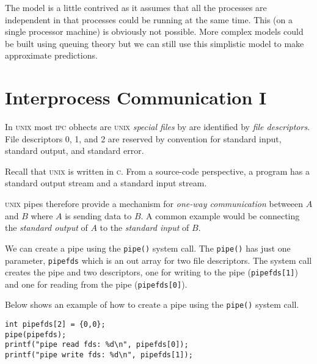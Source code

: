 The model is a little contrived as it assumes that all the processes are independent in that processes 
could be running at the same time. This (on a single processor machine) is obviously not possible. 
More complex models could be built using queuing theory but we can still use this simplistic model 
to make approximate predictions. 

\frmrule

\begin{example}

\end{example}

\frmrule


\section{Interprocess Communication I}





In \textsc{unix} most \textsc{ipc} obhects are \textsc{unix} \textit{special files} by 
are identified by \textit{file descriptors}. 
File descriptors 0, 1, and 2 are reserved by convention 
for standard input, standard output, and standard error.

Recall that \textsc{unix} is written in \textsc{c}. From a source-code perspective, 
a program has a standard output stream and a standard input stream. 


\textsc{unix} pipes therefore provide a mechanism
for \textit{one-way communication} betweeen $A$ and $B$ where 
$A$ is sending data to $B$. A common example would be 
connecting the \textit{standard output} of $A$ 
to the \textit{standard input} of $B$.

We can create a pipe using the \lstinline{pipe()} system call.
The \lstinline{pipe()} has just one parameter, \lstinline{pipefds} 
which is an out array for two file descriptors. 
The system call creates the pipe and two descriptors, 
one for writing to the pipe (\lstinline{pipefds[1]}) 
and one for reading from the pipe (\lstinline{pipefds[0]}). 

\frmrule

\begin{example}
Below shows an example of how to create a pipe 
using the \lstinline{pipe()} system call.

\begin{lstlisting}
int pipefds[2] = {0,0};
pipe(pipefds);
printf("pipe read fds: %d\n", pipefds[0]);
printf("pipe write fds: %d\n", pipefds[1]);
\end{lstlisting}
\end{example}


